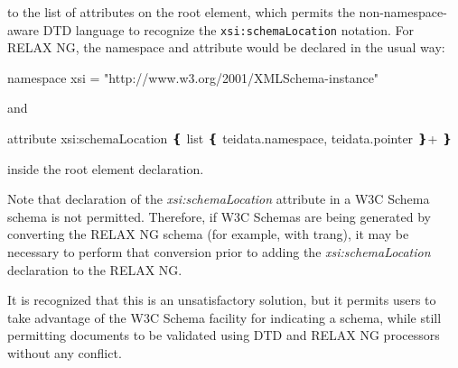 \par\egroup 
 to the list of attributes on the root element, which permits the non-namespace-aware DTD language to recognize the \texttt{xsi:schemaLocation} notation. For RELAX NG, the namespace and attribute would be declared in the usual way: \par\hfill\bgroup\exampleFont\vskip 10pt\begin{shaded}
\obeyspaces namespace xsi = "http://www.w3.org/2001/XMLSchema-instance"\end{shaded}
\par\egroup 
 and \par\hfill\bgroup\exampleFont\vskip 10pt\begin{shaded}
\obeyspaces attribute xsi:schemaLocation ❴ list ❴ teidata.namespace, teidata.pointer ❵+ ❵\end{shaded}
\par\egroup 
 inside the root element declaration.\par
Note that declaration of the {\itshape xsi:schemaLocation} attribute in a W3C Schema schema is not permitted. Therefore, if W3C Schemas are being generated by converting the RELAX NG schema (for example, with  {\name trang}), it may be necessary to perform that conversion prior to adding the {\itshape xsi:schemaLocation} declaration to the RELAX NG.\par
It is recognized that this is an unsatisfactory solution, but it permits users to take advantage of the W3C Schema facility for indicating a schema, while still permitting documents to be validated using DTD and RELAX NG processors without any conflict.
